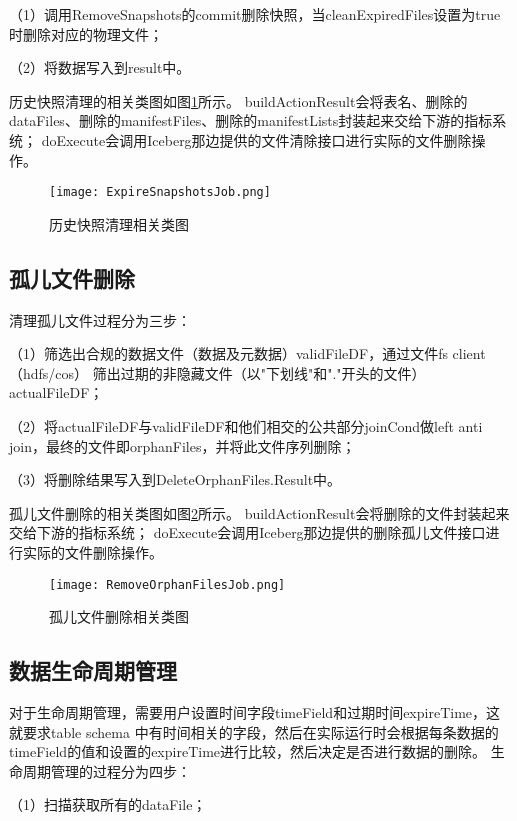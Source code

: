 （1）调⽤RemoveSnapshots的commit删除快照，当cleanExpiredFiles设置为true时删除对应的物理⽂件；

（2）将数据写⼊到result中。

历史快照清理的相关类图如图\ref{fig:ExpireSnapshotsJob}所示。
buildActionResult会将表名、删除的dataFiles、删除的manifestFiles、删除的manifestLists封装起来交给下游的指标系统；
doExecute会调用Iceberg那边提供的文件清除接口进行实际的文件删除操作。

\begin{figure}[H]
  \centering
  \texttt{[image: ExpireSnapshotsJob.png]}
  \caption{历史快照清理相关类图}
  \label{fig:ExpireSnapshotsJob}
\end{figure}

\subsection{孤儿文件删除}

清理孤⼉⽂件过程分为三步：

（1）筛选出合规的数据⽂件（数据及元数据）validFileDF，通过⽂件fs client（hdfs/cos）
筛出过期的⾮隐藏⽂件（以"下划线"和"."开头的⽂件）actualFileDF；

（2）将actualFileDF与validFileDF和他们相交的公共部分joinCond做left anti join，最终的⽂件即orphanFiles，并将此⽂件序列删除；

（3）将删除结果写⼊到DeleteOrphanFiles.Result中。

孤儿文件删除的相关类图如图\ref{fig:孤儿文件删除相关类图}所示。
buildActionResult会将删除的文件封装起来交给下游的指标系统；
doExecute会调用Iceberg那边提供的删除孤儿文件接口进行实际的文件删除操作。

\begin{figure}[H]
  \centering
  \texttt{[image: RemoveOrphanFilesJob.png]}
  \caption{孤儿文件删除相关类图}
  \label{fig:孤儿文件删除相关类图}
\end{figure}

\subsection{数据生命周期管理}

对于生命周期管理，需要用户设置时间字段timeField和过期时间expireTime，这就要求table schema
中有时间相关的字段，然后在实际运行时会根据每条数据的timeField的值和设置的expireTime进行比较，然后决定是否进行数据的删除。
生命周期管理的过程分为四步：

（1）扫描获取所有的dataFile；

